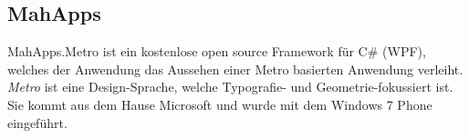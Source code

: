 \subsection{MahApps}
\label{mahapps}
MahApps.Metro ist ein kostenlose open source Framework für C\# (WPF), welches der Anwendung das Aussehen einer Metro basierten Anwendung verleiht. \textit{Metro} ist eine Design-Sprache, welche Typografie- und Geometrie-fokussiert ist. Sie kommt aus dem Hause Microsoft und wurde mit dem Windows 7 Phone eingeführt.\cite{metro}